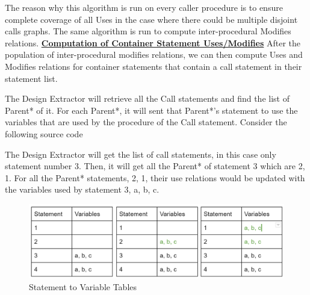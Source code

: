 \documentclass[12pt]{article}
\begin{document}
{{{{{{{{{{The reason why this algorithm is run on every caller procedure is to ensure complete coverage of all Uses in the case where there could be multiple disjoint calls graphs. The same algorithm is run to compute inter-procedural Modifies relations.
\vspace{4mm}\newline
\textbf{\underline{Computation of Container Statement Uses/Modifies}}\newline
After the population of inter-procedural modifies relations, we can then compute Uses and Modifies relations for container statements that contain a call statement in their statement list.

The Design Extractor will retrieve all the Call statements and find the list of Parent* of it. For each Parent*, it will sent that Parent*’s statement to use the variables that are used by the procedure of the Call statement. \newline Consider the following source code
\begin{center}
\end{center}
\vspace{10mm}
The Design Extractor will get the list of call statements, in this case only statement number 3. Then, it will get all the Parent* of statement 3 which are {2, 1}. For all the Parent* statements, {2, 1}, their use relations would be updated with the variables used by statement 3, {a, b, c}.
\begin{figure}[htbp]
  \caption{Statement to Variable Tables}
  \centering  \includegraphics[width=1.0\textwidth]{uses_propagating.png}
\end{figure}
\vspace{4mm}

}}}}}}}}}}
\end{document}
